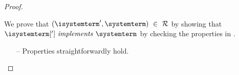 \begin{proof}
\begin{itemize}
\begin{itemize}
				We  prove that $(\isystemterm',\systemterm) \ \in \ \mathcal{R}$ by showing that $\implements{\isystemterm[']}{\systemterm}$ 
				by checking the properties in .	
				\begin{enumerate}
							
						\item[{--}] Properties straightforwardly hold.

					\end{enumerate}




\end{itemize}
\end{itemize}
\end{proof}
